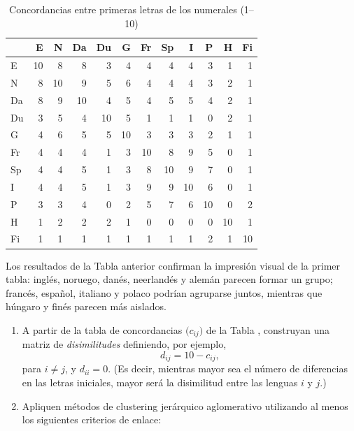 \documentclass[
]{book}
\begin{document}
\begin{table}

\caption{\label{tab:ac21}Concordancias entre primeras letras de los numerales (1--10)}
\centering
\begin{tabular}[t]{l|r|r|r|r|r|r|r|r|r|r|r}
\hline
  & E & N & Da & Du & G & Fr & Sp & I & P & H & Fi\\
\hline
E & 10 & 8 & 8 & 3 & 4 & 4 & 4 & 4 & 3 & 1 & 1\\
\hline
N & 8 & 10 & 9 & 5 & 6 & 4 & 4 & 4 & 3 & 2 & 1\\
\hline
Da & 8 & 9 & 10 & 4 & 5 & 4 & 5 & 5 & 4 & 2 & 1\\
\hline
Du & 3 & 5 & 4 & 10 & 5 & 1 & 1 & 1 & 0 & 2 & 1\\
\hline
G & 4 & 6 & 5 & 5 & 10 & 3 & 3 & 3 & 2 & 1 & 1\\
\hline
Fr & 4 & 4 & 4 & 1 & 3 & 10 & 8 & 9 & 5 & 0 & 1\\
\hline
Sp & 4 & 4 & 5 & 1 & 3 & 8 & 10 & 9 & 7 & 0 & 1\\
\hline
I & 4 & 4 & 5 & 1 & 3 & 9 & 9 & 10 & 6 & 0 & 1\\
\hline
P & 3 & 3 & 4 & 0 & 2 & 5 & 7 & 6 & 10 & 0 & 2\\
\hline
H & 1 & 2 & 2 & 2 & 1 & 0 & 0 & 0 & 0 & 10 & 1\\
\hline
Fi & 1 & 1 & 1 & 1 & 1 & 1 & 1 & 1 & 2 & 1 & 10\\
\hline
\end{tabular}
\end{table}

Los resultados de la Tabla anterior confirman la impresión visual de la primer tabla: inglés, noruego, danés, neerlandés y alemán parecen formar un grupo; francés, español, italiano y polaco podrían agruparse juntos, mientras que húngaro y finés parecen más aislados.

\begin{enumerate}
\def\labelenumi{\arabic{enumi})}
\item
  A partir de la tabla de concordancias
  \(\big(c_{ij}\big)\) de la Tabla ,
  construyan una matriz de \emph{disimilitudes} definiendo, por ejemplo,
  \[
          d_{ij} = 10 - c_{ij},
       \]
  para \(i \neq j\), y \(d_{ii} = 0\).
  (Es decir, mientras mayor sea el número de diferencias en las letras iniciales, mayor será la disimilitud entre las lenguas \(i\) y \(j\).)
\item
  Apliquen métodos de clustering jerárquico aglomerativo utilizando al menos los siguientes criterios de enlace:
\end{enumerate}
\end{document}
